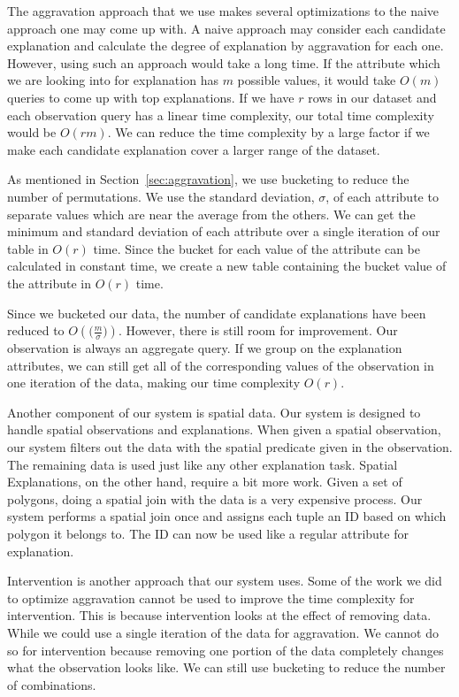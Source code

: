 \label{aggravation_impl}
The aggravation approach that we use makes several optimizations to the naive approach one may come up with. A naive approach may consider each candidate explanation and calculate the degree of explanation by aggravation for each one. However, using such an approach would take a long time. If the attribute which we are looking into for explanation has $m$ possible values, it would take $O(m)$ queries to come up with top explanations. If we have $r$ rows in our dataset and each observation query has a linear time complexity, our total time complexity would be $O(rm)$. We can reduce the time complexity by a large factor if we make each candidate explanation cover a larger range of the dataset.

As mentioned in Section~\ref{sec:aggravation}, we use bucketing to reduce the number of permutations. We use the standard deviation, $\sigma$, of each attribute to separate values which are near the average from the others. We can get the minimum and standard deviation of each attribute over a single iteration of our table in $O(r)$ time. Since the bucket for each value of the attribute can be calculated in constant time, we create a new table containing the bucket value of the attribute in $O(r)$ time.

Since we bucketed our data, the number of candidate explanations have been reduced to $O(\big(\frac{m}{\sigma}\big))$. However, there is still room for improvement. Our observation is always an aggregate query. If we group on the explanation attributes, we can still get all of the corresponding values of the observation in one iteration of the data, making our time complexity $O(r)$.

Another component of our system is spatial data. Our system is designed to handle spatial observations and explanations. When given a spatial observation, our system filters out the data with the spatial predicate given in the observation. The remaining data is used just like any other explanation task. Spatial Explanations, on the other hand, require a bit more work. Given a set of polygons, doing a spatial join with the data is a very expensive process. Our system performs a spatial join once and assigns each tuple an ID based on which polygon it belongs to. The ID can now be used like a regular attribute for explanation.


\label{intervention_impl}

Intervention is another approach that our system uses. Some of the work we did to optimize aggravation cannot be used to improve the time complexity for intervention. This is because intervention looks at the effect of removing data. While we could use a single iteration of the data for aggravation. We cannot do so for intervention because removing one portion of the data completely changes what the observation looks like. We can still use bucketing to reduce the number of combinations.


